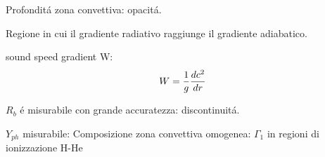 \documentclass[../main.tex]{subfiles}
\begin{document}
\begin{workout}

Profondit\'a zona convettiva: opacit\'a. 

Regione in cui il gradiente radiativo raggiunge il gradiente adiabatico.

sound speed gradient W:
\begin{equation}
W=\frac{1}{g}\TDy{r}{c^2}
\end{equation}

$R_b$ \'e misurabile con grande accuratezza: discontinuit\'a.

$Y_{ph}$ misurabile: Composizione zona convettiva omogenea:  $\Gamma_1$ in regioni di ionizzazione H-He

\end{workout}
\end{document}
